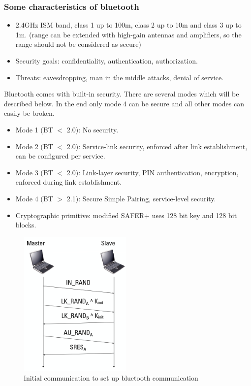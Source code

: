 \documentclass{article}
\begin{document}
\subsubsection*{Some characteristics of bluetooth}
\begin{itemize}
\item 2.4GHz ISM band, class 1 up to 100m, class 2 up to 10m and class 3 up to 1m. (range can be extended with high-gain antennas and amplifiers, so the range should not be considered as secure)
\item Security goals: confidentiality, authentication, authorization.
\item Threats: eavesdropping, man in the middle attacks, denial of service.
\end{itemize}

Bluetooth comes with built-in security. There are several modes which will be described below. In the end only mode 4 can be secure and all other modes can easily be broken.

\begin{itemize}
\item Mode 1 (BT $<$ 2.0): No security.
\item Mode 2 (BT $<$ 2.0): Service-link security, enforced after link establishment, can be configured per service.
\item Mode 3 (BT $<$ 2.0): Link-layer security, PIN authentication, encryption, enforced during link establishment.
\item Mode 4 (BT $>$ 2.1): Secure Simple Pairing, service-level security.
\item Cryptographic primitive: modified SAFER+ uses 128 bit key and 128 bit blocks.
\end{itemize}

\begin{figure}
\includegraphics[width=5.5cm]{images/bt_communication_20.png}
\caption{Initial communication to set up bluetooth communication}
\label{fig:bt_communication_2.0}
\end{figure} 
\end{document}

